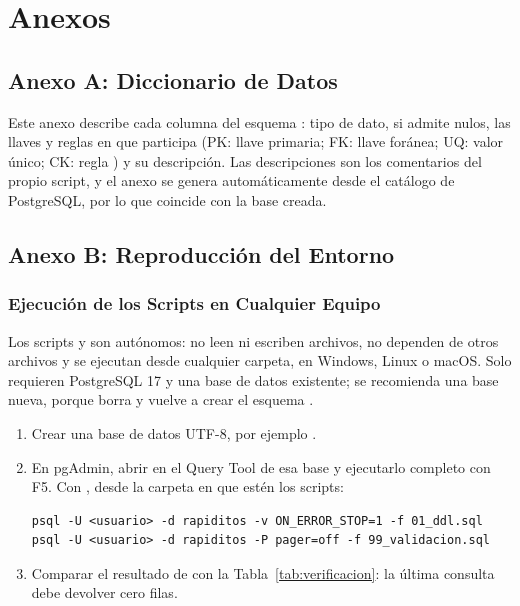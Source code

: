 \section{Anexos}
\label{sec:anexos}

\subsection{Anexo A: Diccionario de Datos}
\label{sec:anexo_diccionario}

Este anexo describe cada columna del esquema : tipo de dato, si admite
nulos, las llaves y reglas en que participa (PK: llave primaria; FK: llave
foránea; UQ: valor único; CK: regla ) y su descripción. Las
descripciones son los comentarios  del propio script, y el
anexo se genera automáticamente desde el catálogo de PostgreSQL, por lo que
coincide con la base creada.



\subsection{Anexo B: Reproducción del Entorno}
\label{sec:anexo_entorno}

\subsubsection{Ejecución de los Scripts en Cualquier Equipo}

Los scripts  y  son autónomos: no leen ni
escriben archivos, no dependen de otros archivos y se ejecutan desde cualquier
carpeta, en Windows, Linux o macOS. Solo requieren PostgreSQL 17 y una base de
datos existente; se recomienda una base nueva, porque  borra y
vuelve a crear el esquema .

\begin{enumerate}[leftmargin=*]
  \item Crear una base de datos UTF-8, por ejemplo .
  \item En pgAdmin, abrir  en el Query Tool de esa base y
        ejecutarlo completo con F5. Con , desde la carpeta en que
        estén los scripts:
\begin{lstlisting}[style=consola]
psql -U <usuario> -d rapiditos -v ON_ERROR_STOP=1 -f 01_ddl.sql
psql -U <usuario> -d rapiditos -P pager=off -f 99_validacion.sql
\end{lstlisting}
  \item Comparar el resultado de  con la
        Tabla~\ref{tab:verificacion}: la última consulta debe devolver cero
        filas.
\end{enumerate}

